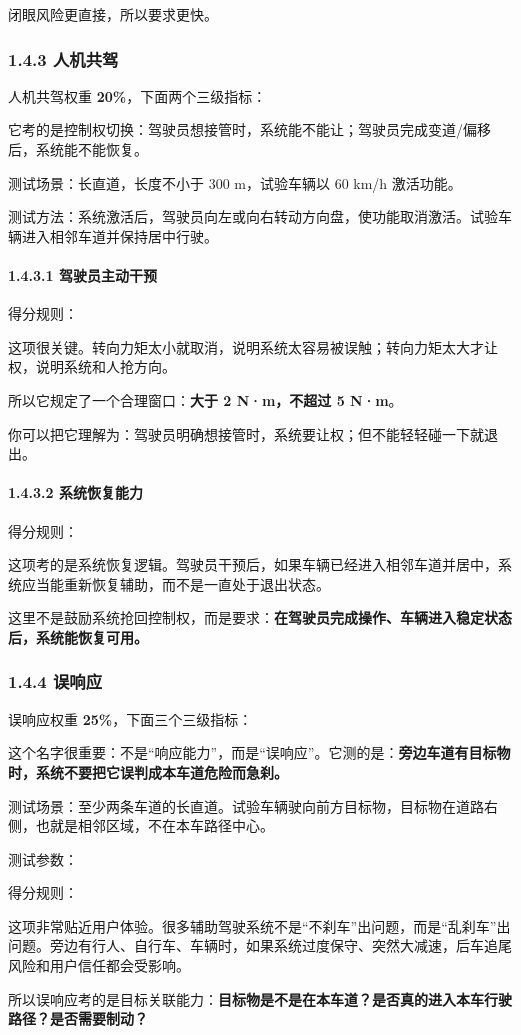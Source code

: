 闭眼风险更直接，所以要求更快。

\subsubsection{1.4.3 人机共驾}

人机共驾权重 \textbf{20\%}，下面两个三级指标：

它考的是控制权切换：驾驶员想接管时，系统能不能让；驾驶员完成变道/偏移后，系统能不能恢复。

测试场景：长直道，长度不小于 300 m，试验车辆以 60 km/h 激活功能。

测试方法：系统激活后，驾驶员向左或向右转动方向盘，使功能取消激活。试验车辆进入相邻车道并保持居中行驶。

\paragraph{1.4.3.1 驾驶员主动干预}

得分规则：

这项很关键。转向力矩太小就取消，说明系统太容易被误触；转向力矩太大才让权，说明系统和人抢方向。

所以它规定了一个合理窗口：\textbf{大于 2 N·m，不超过 5 N·m}。

你可以把它理解为：驾驶员明确想接管时，系统要让权；但不能轻轻碰一下就退出。

\paragraph{1.4.3.2 系统恢复能力}

得分规则：

这项考的是系统恢复逻辑。驾驶员干预后，如果车辆已经进入相邻车道并居中，系统应当能重新恢复辅助，而不是一直处于退出状态。

这里不是鼓励系统抢回控制权，而是要求：\textbf{在驾驶员完成操作、车辆进入稳定状态后，系统能恢复可用。}

\subsubsection{1.4.4 误响应}

误响应权重 \textbf{25\%}，下面三个三级指标：

这个名字很重要：不是“响应能力”，而是“误响应”。它测的是：\textbf{旁边车道有目标物时，系统不要把它误判成本车道危险而急刹。}

测试场景：至少两条车道的长直道。试验车辆驶向前方目标物，目标物在道路右侧，也就是相邻区域，不在本车路径中心。

测试参数：

得分规则：

这项非常贴近用户体验。很多辅助驾驶系统不是“不刹车”出问题，而是“乱刹车”出问题。旁边有行人、自行车、车辆时，如果系统过度保守、突然大减速，后车追尾风险和用户信任都会受影响。

所以误响应考的是目标关联能力：\textbf{目标物是不是在本车道？是否真的进入本车行驶路径？是否需要制动？}

